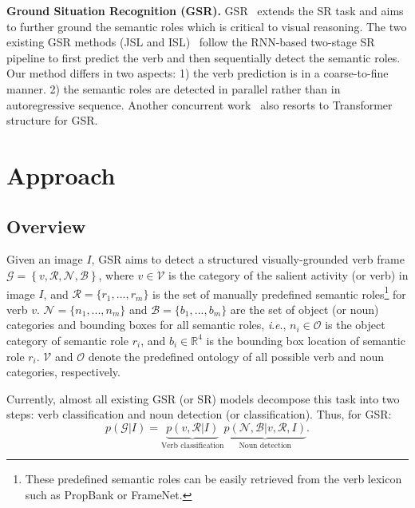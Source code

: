 \documentclass[letterpaper]{article} \usepackage{aaai22}  \usepackage{times}  \usepackage{helvet}  \usepackage{courier}  \usepackage[hyphens]{url}  \usepackage{graphicx} \urlstyle{rm} \def\UrlFont{\rm}  \usepackage{natbib}  \usepackage{caption} \DeclareCaptionStyle{ruled}{labelfont=normalfont,labelsep=colon,strut=off} \frenchspacing  \setlength{\pdfpagewidth}{8.5in}  \setlength{\pdfpageheight}{11in}
\newcommand{\ie}{\textit{i}.\textit{e}.}
\begin{document}
\noindent\textbf{Ground Situation Recognition (GSR).} GSR~\cite{yang2016grounded,silberer2018grounding,pratt2020grounded} extends the SR task and aims to further ground the semantic roles which is critical to visual reasoning. The two existing GSR methods (JSL and ISL)~\cite{pratt2020grounded} follow the RNN-based two-stage SR pipeline to first predict the verb and then sequentially detect the semantic roles.  
Our method differs in two aspects: 1) the verb prediction is in a coarse-to-fine manner. 2) the semantic roles are detected in parallel rather than in autoregressive sequence. Another concurrent work~\cite{cho2021grounded} also resorts to Transformer structure for GSR.










\section{Approach}
\subsection{Overview}
Given an image $I$, GSR aims to detect a structured visually-grounded verb frame $\mathcal{G} = \left \{v, \mathcal{R}, \mathcal{N}, \mathcal{B}\right \}$, where $v \in \mathcal{V}$ is the category of the salient activity (or verb) in image $I$, and $\mathcal{R} = \{r_1, ..., r_m \}$ is the set of manually predefined semantic roles\footnote{These predefined semantic roles can be easily retrieved from the verb lexicon such as PropBank or FrameNet.} for verb $v$. $\mathcal{N} = \{n_1, ..., n_m \}$ and $\mathcal{B} = \{b_1, ..., b_m\}$ are the set of object (or noun) categories and bounding boxes for all semantic roles, \ie, $n_i \in \mathcal{O}$ is the object category of semantic role $r_i$, and $b_i \in \mathbb{R}^4$ is the bounding box location of semantic role $r_i$. $\mathcal{V}$ and $\mathcal{O}$ denote the predefined ontology of all possible verb and noun categories, respectively.

Currently, almost all existing GSR (or SR) models decompose this task into two steps: verb classification and noun detection (or classification). Thus, for GSR:
\begin{equation}
p(\mathcal{G} | I) = \underbrace{p(v, \mathcal{R} | I)}_{\text{Verb classification}} \underbrace{p(\mathcal{N}, \mathcal{B} | v, \mathcal{R}, I)}_{\text{Noun detection}}.
\end{equation}
\end{document}
